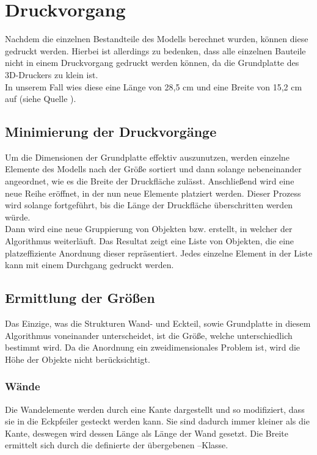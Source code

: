 \section{Druckvorgang}
Nachdem die einzelnen Bestandteile des Modells berechnet wurden, können diese gedruckt werden.
Hierbei ist allerdings zu bedenken, dass alle einzelnen Bauteile nicht in einem Druckvorgang gedruckt werden können, da die Grundplatte des 3D-Druckers zu klein ist. \\
In unserem Fall wies diese eine Länge von 28,5 cm und eine Breite von 15,2 cm auf (siehe Quelle \cite{makerbotspecs}).
\subsection{Minimierung der Druckvorgänge}
Um die Dimensionen der Grundplatte effektiv auszunutzen, werden einzelne Elemente des Modells nach der Größe sortiert und dann solange nebeneinander angeordnet, wie es die Breite der Druckfläche zulässt.
Anschließend wird eine neue Reihe eröffnet, in der nun neue Elemente platziert werden. 
Dieser Prozess wird solange fortgeführt, bis die Länge der Druckfläche überschritten werden würde. \\
Dann wird eine neue Gruppierung von Objekten bzw.  erstellt, in welcher der Algorithmus weiterläuft.
Das Resultat zeigt eine Liste von Objekten, die eine platzeffiziente Anordnung dieser repräsentiert.
Jedes einzelne Element in der Liste kann mit einem Durchgang gedruckt werden.
\subsection{Ermittlung der Größen}
Das Einzige, was die Strukturen Wand- und Eckteil, sowie Grundplatte in diesem Algorithmus voneinander unterscheidet, ist die Größe, welche unterschiedlich bestimmt wird.
Da die Anordnung ein zweidimensionales Problem ist, wird die Höhe der Objekte nicht berücksichtigt.
\subsubsection{Wände}
Die Wandelemente werden durch eine Kante dargestellt und so modifiziert, dass sie in die Eckpfeiler gesteckt werden kann.
Sie sind dadurch immer kleiner als die Kante, deswegen wird dessen Länge als Länge der Wand gesetzt. 
Die Breite ermittelt sich durch die definierte  der übergebenen --Klasse.
